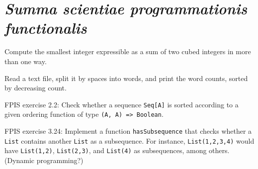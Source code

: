 
\chapter{\emph{Summa scientiae programmationis functionalis}}

Compute the smallest integer expressible as a sum of two cubed integers
in more than one way.

Read a text file, split it by spaces into words, and print the word
counts, sorted by decreasing count.

FPIS exercise 2.2: Check whether a sequence \lstinline!Seq[A]! is
sorted according to a given ordering function of type \lstinline!(A, A) => Boolean!.

FPIS exercise 3.24: Implement a function \lstinline!hasSubsequence!
that checks whether a \lstinline!List! contains another \lstinline!List!
as a subsequence. For instance, \lstinline!List(1,2,3,4)! would have
\lstinline!List(1,2)!, \lstinline!List(2,3)!, and \lstinline!List(4)!
as subsequences, among others. (Dynamic programming?)
